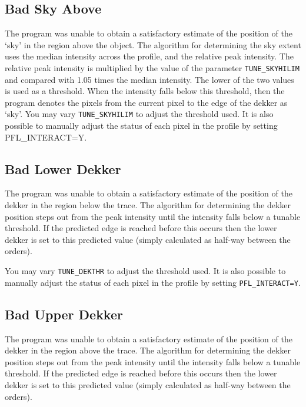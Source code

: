 \documentclass[11pt,twoside]{article}
\newcommand{\xlabel}[1]{}
\newcommand{\mlabel}[1]{\xlabel{#1}\label{#1}}
\newcommand{\myindex}[1]{\index{#1}}
\renewcommand{\myindex}[1]{}
\begin{document}
\subsection{\mlabel{bad_sky_above} Bad Sky Above}

The program was unable to obtain a satisfactory estimate of the position
of the `sky' in the region above the object. The algorithm for
determining the sky extent uses the median intensity across the profile,
and the relative peak intensity. The relative peak intensity is
multiplied by the value of the parameter \texttt{TUNE\_SKYHILIM} and compared
with 1.05 times the median intensity. The lower of the two values is used as
a threshold. When the intensity falls below this threshold,  then the
program denotes the pixels from the current pixel to the edge of the
dekker as `sky'.  You may vary \texttt{TUNE\_SKYHILIM} to adjust the
threshold used. It is also possible to manually adjust the status of
each pixel in the profile by setting PFL\_INTERACT=Y.

\subsection{\mlabel{bad_lower_dekker} Bad Lower Dekker}
\myindex{Dekker limits!failure}

The program was unable to obtain a satisfactory estimate of the position
of the dekker in the region below the trace. The algorithm for
determining the dekker position steps out from the peak intensity until
the intensity falls below a tunable threshold. If the predicted edge is
reached before this occurs then the lower dekker is set to this
predicted value (simply calculated as half-way between the orders).

You may vary \texttt{TUNE\_DEKTHR} to adjust the threshold used.
It is also possible to manually adjust the status of each pixel in the
profile by setting \texttt{PFL\_INTERACT=Y}\@.

\subsection{\mlabel{bad_upper_dekker} Bad Upper Dekker}

The program was unable to obtain a satisfactory estimate of the position
of the dekker in the region above the trace. The algorithm for
determining the dekker position steps out from the peak intensity until
the intensity falls below a tunable threshold. If the predicted edge is
reached before this occurs then the lower dekker is set to this
predicted value (simply calculated as half-way between the orders).
\end{document}
